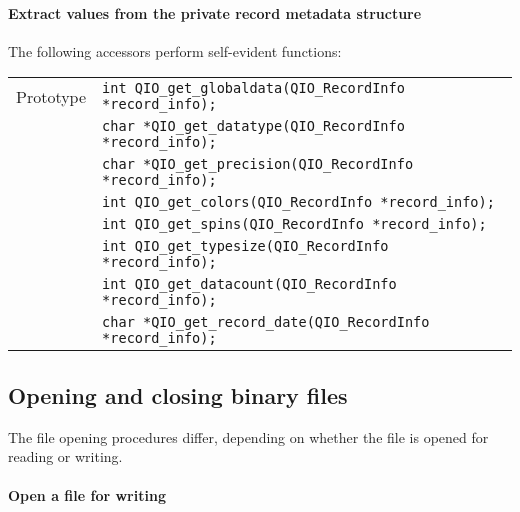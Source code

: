 \documentclass{article}
\begin{document}
\paragraph{Extract values from the private record metadata structure}
The following accessors perform self-evident functions:
%
%
\begin{flushleft}
  \begin{tabular}{|l|l|}
  \hline
  Prototype      & \verb|int QIO_get_globaldata(QIO_RecordInfo *record_info);| \\
                 & \verb|char *QIO_get_datatype(QIO_RecordInfo *record_info);| \\
                 & \verb|char *QIO_get_precision(QIO_RecordInfo *record_info);| \\
                 & \verb|int QIO_get_colors(QIO_RecordInfo *record_info);| \\
                 & \verb|int QIO_get_spins(QIO_RecordInfo *record_info);| \\
                 & \verb|int QIO_get_typesize(QIO_RecordInfo *record_info);| \\
                 & \verb|int QIO_get_datacount(QIO_RecordInfo *record_info);| \\
                 & \verb|char *QIO_get_record_date(QIO_RecordInfo *record_info);| \\
\hline
 \end{tabular}
\end{flushleft}


\subsection{Opening and closing binary files}

The file opening procedures differ, depending on whether the file is
opened for reading or writing.

\paragraph{Open a file for writing}
\end{document}
